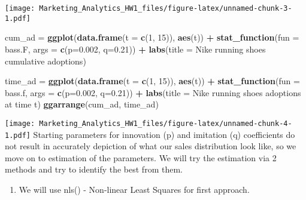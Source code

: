 \documentclass[
]{article}
\newenvironment{Shaded}{\begin{snugshade}}{\end{snugshade}}
\newcommand{\AttributeTok}[1]{\textcolor[rgb]{0.13,0.29,0.53}{#1}}
\newcommand{\DecValTok}[1]{\textcolor[rgb]{0.00,0.00,0.81}{#1}}
\newcommand{\FloatTok}[1]{\textcolor[rgb]{0.00,0.00,0.81}{#1}}
\newcommand{\FunctionTok}[1]{\textcolor[rgb]{0.13,0.29,0.53}{\textbf{#1}}}
\newcommand{\NormalTok}[1]{#1}
\newcommand{\OtherTok}[1]{\textcolor[rgb]{0.56,0.35,0.01}{#1}}
\newcommand{\SpecialCharTok}[1]{\textcolor[rgb]{0.81,0.36,0.00}{\textbf{#1}}}
\newcommand{\StringTok}[1]{\textcolor[rgb]{0.31,0.60,0.02}{#1}}
\providecommand{\tightlist}{%
  \setlength{\itemsep}{0pt}\setlength{\parskip}{0pt}}
\begin{document}
\texttt{[image: Marketing\_Analytics\_HW1\_files/figure-latex/unnamed-chunk-3-1.pdf]}

\begin{Shaded}
\begin{Highlighting}[]
\NormalTok{cum\_ad }\OtherTok{=} \FunctionTok{ggplot}\NormalTok{(}\FunctionTok{data.frame}\NormalTok{(}\AttributeTok{t =} \FunctionTok{c}\NormalTok{(}\DecValTok{1}\NormalTok{, }\DecValTok{15}\NormalTok{)), }\FunctionTok{aes}\NormalTok{(t)) }\SpecialCharTok{+}
\FunctionTok{stat\_function}\NormalTok{(}\AttributeTok{fun =}\NormalTok{ bass.F, }\AttributeTok{args =} \FunctionTok{c}\NormalTok{(}\AttributeTok{p=}\FloatTok{0.002}\NormalTok{, }\AttributeTok{q=}\FloatTok{0.21}\NormalTok{)) }\SpecialCharTok{+}
\FunctionTok{labs}\NormalTok{(}\AttributeTok{title =} \StringTok{\textquotesingle{}Nike running shoes cumulative adoptions\textquotesingle{}}\NormalTok{)}


\NormalTok{time\_ad }\OtherTok{=} \FunctionTok{ggplot}\NormalTok{(}\FunctionTok{data.frame}\NormalTok{(}\AttributeTok{t =} \FunctionTok{c}\NormalTok{(}\DecValTok{1}\NormalTok{, }\DecValTok{15}\NormalTok{)), }\FunctionTok{aes}\NormalTok{(t)) }\SpecialCharTok{+}
\FunctionTok{stat\_function}\NormalTok{(}\AttributeTok{fun =}\NormalTok{ bass.f, }\AttributeTok{args =} \FunctionTok{c}\NormalTok{(}\AttributeTok{p=}\FloatTok{0.002}\NormalTok{, }\AttributeTok{q=}\FloatTok{0.21}\NormalTok{)) }\SpecialCharTok{+}
\FunctionTok{labs}\NormalTok{(}\AttributeTok{title =} \StringTok{\textquotesingle{}Nike running shoes adoptions at time t\textquotesingle{}}\NormalTok{)}
\FunctionTok{ggarrange}\NormalTok{(cum\_ad, time\_ad)}
\end{Highlighting}
\end{Shaded}

\texttt{[image: Marketing\_Analytics\_HW1\_files/figure-latex/unnamed-chunk-4-1.pdf]}
Starting parameters for innovation (p) and imitation (q) coefficients do
not result in accurately depiction of what our sales distribution look
like, so we move on to estimation of the parameters. We will try the
estimation via 2 methods and try to identify the best from them.

\begin{enumerate}
\def\labelenumi{\arabic{enumi})}
\tightlist
\item
  We will use nls() - Non-linear Least Squares for first approach.
\end{enumerate}
\end{document}
